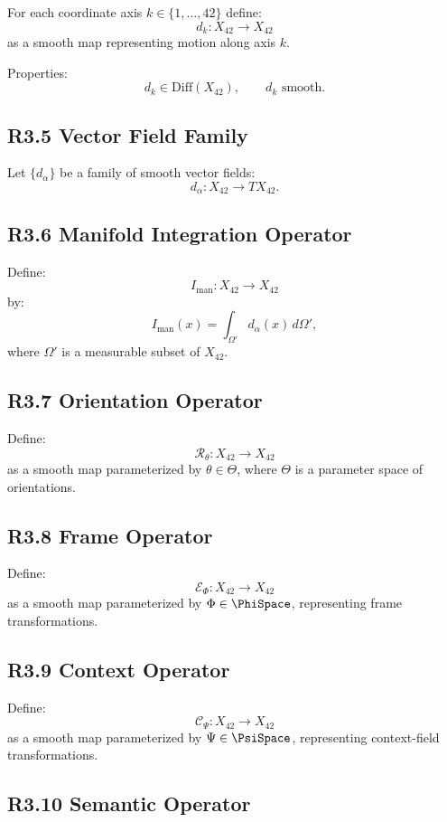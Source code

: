 For each coordinate axis $k \in \{1,\dots,42\}$ define:
\[
d_k : X_{42} \to X_{42}
\]
as a smooth map representing motion along axis $k$.

Properties:
\[
d_k \in \mathrm{Diff}(X_{42}),\qquad d_k \text{ smooth}.
\]

\subsection*{R3.5 Vector Field Family}

Let $\{d_{\alpha}\}$ be a family of smooth vector fields:
\[
d_{\alpha} : X_{42} \to TX_{42}.
\]

\subsection*{R3.6 Manifold Integration Operator}

Define:
\[
I_{\mathrm{man}} : X_{42} \to X_{42}
\]
by:
\[
I_{\mathrm{man}}(x) = \int_{\Omega'} d_{\alpha}(x)\, d\Omega',
\]
where $\Omega'$ is a measurable subset of $X_{42}$.

\subsection*{R3.7 Orientation Operator}

Define:
\[
\mathcal{R}_{\theta} : X_{42} \to X_{42}
\]
as a smooth map parameterized by $\theta \in \Theta$, where $\Theta$ is a
parameter space of orientations.

\subsection*{R3.8 Frame Operator}

Define:
\[
\mathcal{E}_{\Phi} : X_{42} \to X_{42}
\]
as a smooth map parameterized by $\Phi \in \PhiSpace$, representing frame
transformations.

\subsection*{R3.9 Context Operator}

Define:
\[
\mathcal{C}_{\Psi} : X_{42} \to X_{42}
\]
as a smooth map parameterized by $\Psi \in \PsiSpace$, representing
context-field transformations.

\subsection*{R3.10 Semantic Operator}

